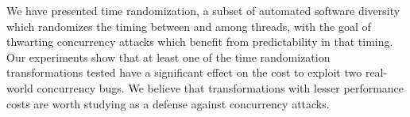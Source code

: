 We have presented time randomization, a subset of automated software diversity which randomizes the timing between and among threads, with the goal of thwarting concurrency attacks which benefit from predictability in that timing.
Our experiments show that at least one of the time randomization
transformations tested have a significant effect on the cost to exploit two
real-world concurrency bugs.
We believe that transformations with lesser performance costs are worth studying as a defense against concurrency attacks.
